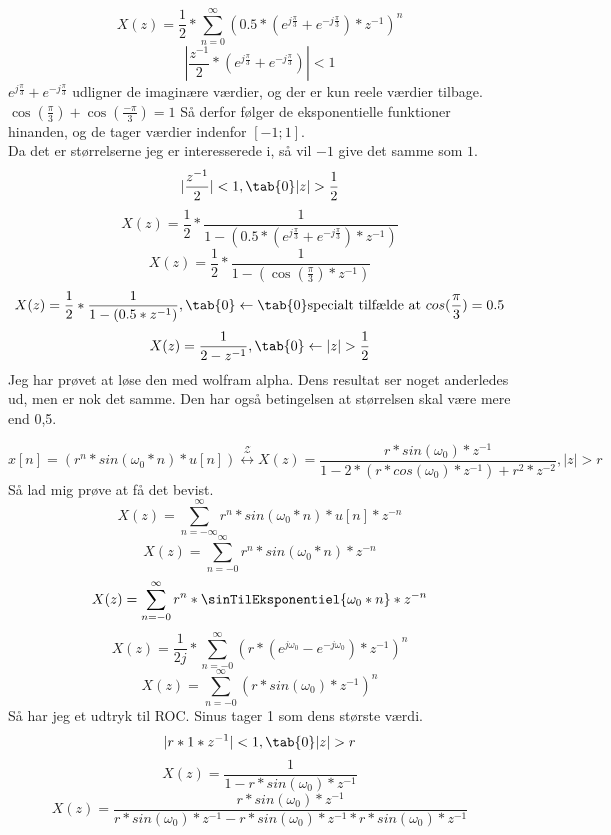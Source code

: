 \begin{Opgaver}
\begin{kapitel}[Z transformation]
\begin{Opgave}
\begin{UnderOpgave}[\text{$x[n] = (1/2)^n * cos(\pi * n/3)*u[n]$}, forkert]
                \[X(z) = \frac{1}{2} * \sum_{n=0}^{\infty}{(0.5 * (e^{j\frac{\pi}{3}} + e^{-j\frac{\pi}{3}}) * z^{-1})^n }\]
                \[|\frac{z^{-1}}{2} * (e^{j\frac{\pi}{3}} + e^{-j\frac{\pi}{3}})| < 1\]
                $e^{j\frac{\pi}{3}} + e^{-j\frac{\pi}{3}}$ udligner de imaginære værdier, og der er kun reele værdier tilbage. $\cos(\frac{\pi}{3}) + \cos(\frac{-\pi}{3}) = 1$
                Så derfor følger de eksponentielle funktioner hinanden, og de tager værdier indenfor $[-1; 1]$.\\
                Da det er størrelserne jeg er interesserede i, så vil $-1$ give det samme som $1$.\\
                \[|\frac{z^{-1}}{2}| < 1, \tab{0} |z| > \frac{1}{2}\]
                \[X(z) = \frac{1}{2} * \frac{1}{1 - (0.5 * (e^{j\frac{\pi}{3}} + e^{-j\frac{\pi}{3}}) * z^{-1})}\]
                \[X(z) = \frac{1}{2} * \frac{1}{1 - (\cos(\frac{\pi}{3}) * z^{-1})}\]
                \[X(z) = \frac{1}{2} * \frac{1}{1 - (0.5 * z^{-1})}, \tab{0} \leftarrow \tab{0} \text{specialt tilfælde at } cos(\frac{\pi}{3}) = 0.5\]
                \[X(z) = \frac{1}{2 - z^{-1}},\tab{0} \leftarrow |z| > \frac{1}{2}\]
                Jeg har prøvet at løse den med wolfram alpha. Dens resultat ser noget anderledes ud, men er nok det samme. Den har også betingelsen at størrelsen skal være mere end 0,5.
            \end{UnderOpgave}
        \end{Opgave}
        \begin{Opgave}
            \[x[n] = (r^n * sin(\omega_0 * n)*u[n]) \overset{\mathscr{Z}}{\leftrightarrow} X(z) = \frac{r*sin(\omega_0)*z^{-1}}{1 - 2*(r*cos(\omega_0) * z^{-1}) + r^2*z^{-2}}, |z| > r\]
            Så lad mig prøve at få det bevist.
            \[X(z) = \sum_{n=-\infty}^{\infty}{r^n * sin(\omega_0 * n) * u[n] * z^{-n}}\]
            \[X(z) = \sum_{n=-0}^{\infty}{r^n * sin(\omega_0 * n) * z^{-n}}\]
            \[X(z) = \sum_{n=-0}^{\infty}{r^n * \sinTilEksponentiel{\omega_0 * n} * z^{-n}}\]
            \[X(z) = \frac{1}{2j} * \sum_{n=-0}^{\infty}{(r * (e^{j\omega_0} - e^{-j\omega_0}) * z^{-1})^n}\]
            \[X(z) = \sum_{n=-0}^{\infty}{(r * sin(\omega_0) * z^{-1})^n}\]
            Så har jeg et udtryk til ROC. Sinus tager 1 som dens største værdi. 
            \[|r * 1 * z^{-1}| < 1, \tab{0} |z| > r \]
            \[X(z) = {\frac{1}{1 - r * sin(\omega_0) * z^{-1}}}\]
            \[X(z) = {\frac{r * sin(\omega_0) * z^{-1}}{r * sin(\omega_0) * z^{-1} - r * sin(\omega_0) * z^{-1} * r * sin(\omega_0) * z^{-1}}}\]

\end{Opgave}
\end{kapitel}
\end{Opgaver}
